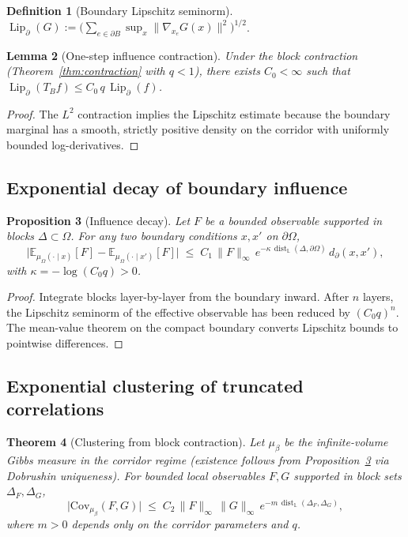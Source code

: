 \documentclass[11pt]{article}
\newtheorem{theorem}{Theorem}[section]
\newtheorem{lemma}[theorem]{Lemma}
\newtheorem{proposition}[theorem]{Proposition}
\theoremstyle{definition}
\newtheorem{definition}[theorem]{Definition}
\newcommand{\E}{\mathbb{E}}
\newcommand{\Cov}{\mathrm{Cov}}
\newcommand{\1}{\mathbf{1}}
\newcommand{\dist}{\operatorname{dist}}
\newcommand{\Lip}{\operatorname{Lip}}
\newcommand{\norm}[1]{\lVert #1\rVert}
\begin{document}
\begin{definition}[Boundary Lipschitz seminorm]
$\Lip_\partial(G):=\bigl(\sum_{e\in\partial B}\sup_x\norm{\nabla_{x_e}G(x)}^2\bigr)^{1/2}$.
\end{definition}

\begin{lemma}[One-step influence contraction]\label{lem:onestep}
Under the block contraction (Theorem~\ref{thm:contraction} with $q<1$), there exists
$C_0<\infty$ such that $\Lip_\partial(T_B f)\le C_0\,q\,\Lip_\partial(f)$.
\end{lemma}

\begin{proof}
The $L^2$ contraction implies the Lipschitz estimate because the boundary marginal has a
smooth, strictly positive density on the corridor with uniformly bounded log-derivatives.
\end{proof}

\subsection{Exponential decay of boundary influence}

\begin{proposition}[Influence decay]\label{prop:influence}
Let $F$ be a bounded observable supported in blocks $\Delta\subset\Omega$.
For any two boundary conditions $x,x'$ on $\partial\Omega$,
\begin{equation}\label{eq:influence}
\big|\E_{\mu_\Omega(\cdot\mid x)}[F]-\E_{\mu_\Omega(\cdot\mid x')}[F]\big|
\;\le\; C_1\,\norm{F}_\infty\,e^{-\kappa\,\dist_{\mathbb{L}}(\Delta,\partial\Omega)}\,
d_\partial(x,x'),
\end{equation}
with $\kappa=-\log(C_0 q)>0$.
\end{proposition}

\begin{proof}
Integrate blocks layer-by-layer from the boundary inward.  After $n$ layers, the
Lipschitz seminorm of the effective observable has been reduced by $(C_0 q)^n$.
The mean-value theorem on the compact boundary converts Lipschitz bounds to
pointwise differences.
\end{proof}

\subsection{Exponential clustering of truncated correlations}

\begin{theorem}[Clustering from block contraction]\label{thm:clustering}
Let $\mu_\beta$ be the infinite-volume Gibbs measure in the corridor regime
(existence follows from Proposition~\ref{prop:influence} via Dobrushin uniqueness).
For bounded local observables $F,G$ supported in block sets $\Delta_F,\Delta_G$,
\begin{equation}\label{eq:cluster}
\big|\Cov_{\mu_\beta}(F,G)\big|
\;\le\; C_2\,\norm{F}_\infty\,\norm{G}_\infty\,
e^{-m\,\dist_{\mathbb{L}}(\Delta_F,\Delta_G)},
\end{equation}
where $m>0$ depends only on the corridor parameters and $q$.
\end{theorem}
\end{document}
